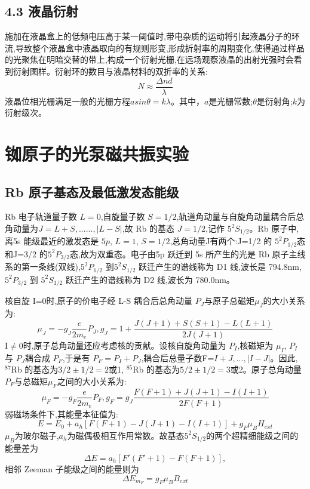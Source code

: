 \documentclass[12pt, a4paper]{article}
\begin{document}
\subsection{4.3 液晶衍射}
施加在液晶盒上的低频电压高于某一阈值时,带电杂质的运动将引起液晶分子的环流,导致整个液晶盒中液晶取向的有规则形变,形成折射率的周期变化,使得通过样品的光聚焦在明暗交替的带上,构成一个衍射光栅,在远场观察液晶的出射光强时会看到衍射图样。衍射环的数目与液晶材料的双折率的关系:
\begin{equation}
    N \approx \frac{\Delta n d}{\lambda}
\end{equation}
液晶位相光栅满足一般的光栅方程$asin\theta = k\lambda$。其中，$a$是光栅常数;$\theta$是衍射角;$k$为衍射级次。

\section{铷原子的光泵磁共振实验}
\subsection{Rb 原子基态及最低激发态能级}

Rb 电子轨道量子数 $L=0$,自旋量子数 $S=1/2$,轨道角动量与自旋角动量耦合后总角动量为$J=L+S,......,|L-S|$,故 Rb 的基态 $J=1/2$,记作 $5^2S_{1/2}$。Rb 原子中,离5s 能级最近的激发态是 $5p$, $L=1$, $S=1/2$,总角动量J有两个:J=1/2 的 $5^2P_{1/2}$态和J=3/2 的$5^2P_{3/2}$态,故为双重态。电子由5p 跃迁到 5s 所产生的光是 Rb 原子主线系的第一条线(双线),$5^2P_{1/2}$ 到$5^2S_{1/2}$ 跃迁产生的谱线称为 D1 线,波长是 794.8nm, $5^2P_{3/2}$ 到 $5^2S_{1/2}$ 跃迁产生的谱线称为 D2 线,波长为 780.0nm。

核自旋 I=0时,原子的价电子经 L-S 耦合后总角动量 $P_J$与原子总磁矩$\mu_J$的大小关系为:
\begin{equation}
\mu_J = -g_J \frac{e}{2m_e} P_J,   g_J = 1 + \frac{J(J+1)+S(S+1)-L(L+1)}{2J(J+1)}
\end{equation}
I$\neq 0$时,原子总角动量还应考虑核的贡献。设核自旋角动量为 $P_I$,核磁矩为 $\mu_I$, $P_I$ 与 $P_J$耦合成 $P_F$,于是有 $P_F=P_I+P_J$,耦合后总量子数F=$I+J,...,|I-J|$。因此, $^{87}$Rb 的基态为$3/2\pm1/2=2$或1, $^{85}$Rb 的基态为$5/2\pm1/2=3$或2。原子总角动量 $P_F$与总磁矩$\mu_F$之间的大小关系为:
\begin{equation}
    \mu_F = -g_F \frac{e}{2m_e} P_F,  g_F = g_J \frac{F(F+1)+J(J+1)-I(I+1)}{2F(F+1)}
\end{equation}
弱磁场条件下,其能量本征值为:
\begin{equation}
    E=E_0+a_h[F(F+1)-J(J+1)-I(I+1)]+g_F\mu_B H_{ext}
\end{equation}
$\mu_B$为玻尔磁子,$a_h$为磁偶极相互作用常数。故基态$5^2S_{1/2}$的两个超精细能级之间的能量差为
\begin{equation}
    \Delta E=a_h[F'(F'+1)-F(F+1)],
\end{equation}
相邻 Zeeman 子能级之间的能量则为
\begin{equation}
    \Delta E_{m_F} = g_F\mu_B B_{ext}
\end{equation}
\end{document}
